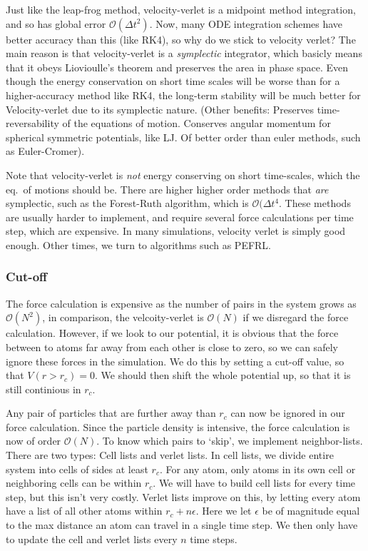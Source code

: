 \documentclass[a4paper, 11pt, notitlepage, english]{article}
\newcommand{\eps}{\epsilon}
\begin{document}
Just like the leap-frog method, velocity-verlet is a midpoint method integration, and so has global error $\mathcal{O}(\Delta t^2)$. Now, many ODE integration schemes have better accuracy than this (like RK4), so why do we stick to velocity verlet? The main reason is that velocity-verlet is a \emph{symplectic} integrator, which basicly means that it obeys Liovioulle's theorem and preserves the area in phase space. Even though the energy conservation on short time scales will be worse than for a higher-accuracy method like RK4, the long-term stability will be much better for Velocity-verlet due to its symplectic nature. (Other benefits: Preserves time-reversability of the equations of motion. Conserves angular momentum for spherical symmetric potentials, like LJ. Of better order than euler methods, such as Euler-Cromer).

Note that velocity-verlet is \emph{not} energy conserving on short time-scales, which the eq.\ of motions should be. There are higher higher order methods that \emph{are} symplectic, such as the Forest-Ruth algorithm, which is $\mathcal{O}(\Delta t^4$. These methods are usually harder to implement, and require several force calculations per time step, which are expensive. In many simulations, velocity verlet is simply good enough. Other times, we turn to algorithms such as PEFRL. 

\subsubsection*{Cut-off}

The force calculation is expensive as the number of pairs in the system grows as $\mathcal{O}(N^2)$, in comparison, the velcoity-verlet is $\mathcal{O}(N)$ if we disregard the force calculation. However, if we look to our potential, it is obvious that the force between to atoms far away from each other is close to zero, so we can safely ignore these forces in the simulation. We do this by setting a cut-off value, so that $V(r>r_c) = 0$. We should then shift the whole potential up, so that it is still continious in $r_c$.

Any pair of particles that are further away than $r_c$ can now be ignored in our force calculation. Since the particle density is intensive, the force calculation is now of order $\mathcal{O}(N)$. To know which pairs to `skip', we implement neighbor-lists. There are two types: Cell lists and verlet lists. In cell lists, we divide entire system into cells of sides at least $r_c$. For any atom, only atoms in its own cell or neighboring cells can be within $r_c$. We will have to build cell lists for every time step, but this isn't very costly. Verlet lists improve on this, by letting every atom have a list of all other atoms within $r_c + n\eps$. Here we let $\eps$ be of magnitude equal to the max distance an atom can travel in a single time step. We then only have to update the cell and verlet lists every $n$ time steps.
\end{document}
